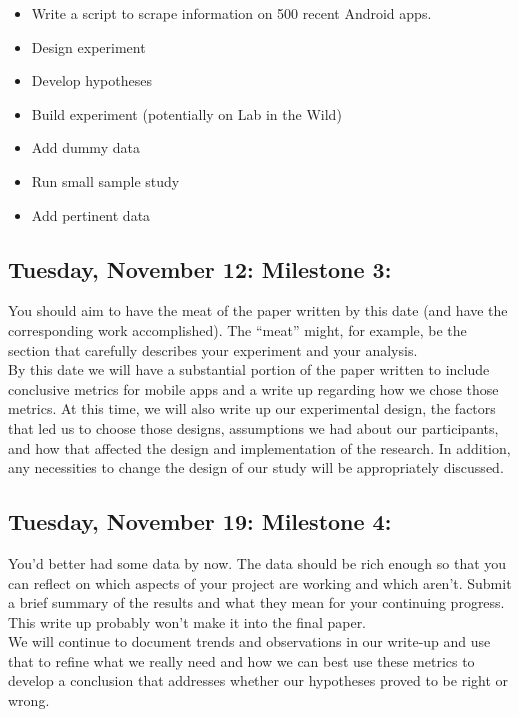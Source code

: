\documentclass{article}
\begin{document}
\begin{itemize}
\item Write a script to scrape information on 500 recent Android apps.
\item Design experiment
\item Develop hypotheses
\item Build experiment (potentially on Lab in the Wild)
\item Add dummy data
\item Run small sample study
\item Add pertinent data
\end{itemize}

\subsection{Tuesday, November 12: Milestone 3:}

You should aim to have the meat of the paper written by this date (and have the corresponding work accomplished). The “meat” might, for example, be the section that carefully describes your experiment and your analysis. \\

	By this date we will have a substantial portion of the paper written to include conclusive metrics for mobile apps and a write up regarding how we chose those metrics.  At this time, we will also write up our experimental design, the factors that led us to choose those designs, assumptions we had about our participants, and how that affected the design and implementation of the research. In addition, any necessities to change the design of our study will be appropriately discussed. \\

\subsection{Tuesday, November 19: Milestone 4:}

You'd better had some data by now. The data should be rich enough so that you can reflect on which aspects of your project are working and which aren't. Submit a brief summary of the results and what they mean for your continuing progress. This write up probably won't make it into the final paper. \\

	We will continue to document trends and observations in our write-up and use that to refine what we really need and how we can best use these metrics to develop a conclusion that addresses whether our hypotheses proved to be right or wrong. \\
\end{document}
